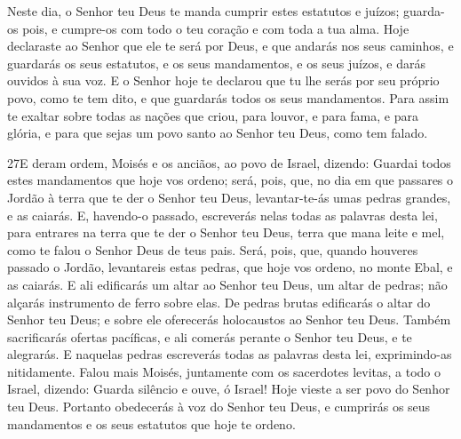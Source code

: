 Neste dia, o Senhor teu Deus te manda cumprir estes estatutos e
juízos; guarda-os pois, e cumpre-os com todo o teu coração e com
toda a tua alma. Hoje declaraste ao Senhor que ele te será
por Deus, e que andarás nos seus caminhos, e guardarás os seus
estatutos, e os seus mandamentos, e os seus juízos, e darás ouvidos
à sua voz. E o Senhor hoje te declarou que tu lhe serás por
seu próprio povo, como te tem dito, e que guardarás todos os seus
mandamentos. Para assim te exaltar sobre todas as nações que
criou, para louvor, e para fama, e para glória, e para que sejas um
povo santo ao Senhor teu Deus, como tem falado.

\medskip

\lettrine{27} E deram ordem, Moisés e os anciãos, ao povo de
Israel, dizendo: Guardai todos estes mandamentos que hoje vos
ordeno; será, pois, que, no dia em que passares o Jordão à terra
que te der o Senhor teu Deus, levantar-te-ás umas pedras grandes, e
as caiarás. E, havendo-o passado, escreverás nelas todas as
palavras desta lei, para entrares na terra que te der o Senhor teu
Deus, terra que mana leite e mel, como te falou o Senhor Deus de
teus pais. Será, pois, que, quando houveres passado o Jordão,
levantareis estas pedras, que hoje vos ordeno, no monte Ebal, e as
caiarás. E ali edificarás um altar ao Senhor teu Deus, um altar
de pedras; não alçarás instrumento de ferro sobre elas. De
pedras brutas edificarás o altar do Senhor teu Deus; e sobre ele
oferecerás holocaustos ao Senhor teu Deus. Também sacrificarás
ofertas pacíficas, e ali comerás perante o Senhor teu Deus, e te
alegrarás. E naquelas pedras escreverás todas as palavras desta
lei, exprimindo-as nitidamente. Falou mais Moisés, juntamente
com os sacerdotes levitas, a todo o Israel, dizendo: Guarda silêncio
e ouve, ó Israel! Hoje vieste a ser povo do Senhor teu Deus.
Portanto obedecerás à voz do Senhor teu Deus, e cumprirás os
seus mandamentos e os seus estatutos que hoje te ordeno.

